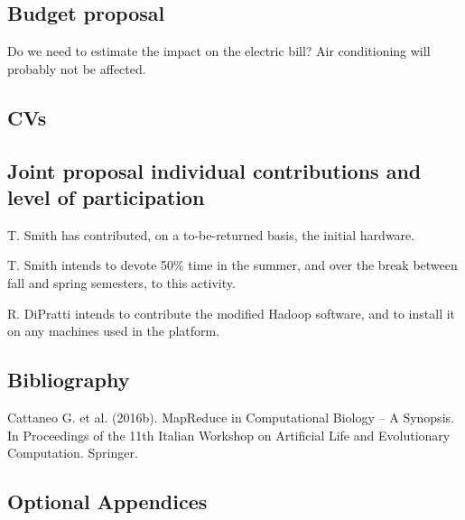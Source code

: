 \documentclass[]{article}
\begin{document}
 \subsection{Budget proposal}
 
 Do we need to estimate the impact on the electric bill? Air conditioning will probably not be affected.
 
 \subsection{CVs}
 \subsection{Joint proposal individual contributions and level of participation}
 
 T. Smith has contributed, on a to-be-returned basis, the initial hardware.
 
 T. Smith intends to devote 50\% time in the summer, and over the break between fall and spring semesters, to this activity.
 
 R. DiPratti intends to contribute the modified Hadoop software, and to install it on any machines used in the platform.
 
 \subsection{Bibliography} %
 
 Cattaneo G. et al.   (2016b). MapReduce in Computational Biology – A Synopsis. In Proceedings of the 11th Italian Workshop on Artificial Life and Evolutionary Computation. Springer.
 
 
 
 
 \subsection{Optional Appendices} %
 
 
\end{document}

